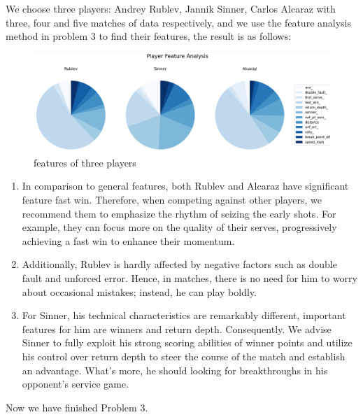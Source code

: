 We choose three players: Andrey Rublev, Jannik Sinner, Carlos Alcaraz 
with three, four and five matches of data respectively,
and we use the feature analysis method in problem 3 to find their features, the result is as follows:
\begin{figure}[H]
    \centering
    \includegraphics[scale=0.4]{mainmatter/imgs/9.png}
    \caption{features of three players}
\end{figure}
\begin{enumerate}
    \item In comparison to general features, both Rublev and Alcaraz have significant feature fast win. 
    Therefore, when competing against other players, we recommend them to emphasize the rhythm of seizing 
    the early shots. For example, they can focus more on the quality of their serves, 
    progressively achieving a fast win to enhance their momentum. 
    \item Additionally, Rublev is hardly affected by negative factors such as double fault and 
    unforced error. Hence, in matches, there is no need for him to worry about occasional mistakes; 
    instead, he can play boldly.
    \item For Sinner, his technical characteristics are remarkably different, 
    important features for him are winners and return depth. Consequently.
    We advise Sinner to fully exploit his strong scoring abilities of winner points
    and utilize his control over return depth to steer the course of the match and establish an advantage.
    What's more, he should looking for breakthroughs in his opponent's service game.

\end{enumerate}

Now we have finished Problem 3.